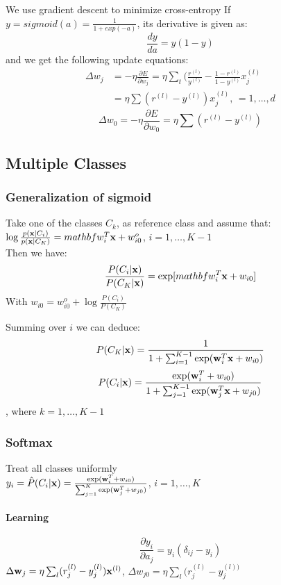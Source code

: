\begin{description}
        We use gradient descent to minimize cross-entropy 
        If $y = sigmoid(a) = \frac{1}{1 + exp(-a)}$, its derivative is given as:
        \[ \frac{dy}{da} = y(1-y) \]
        and we get the following update equations:
        \begin{align*}
            \Delta w_j & = -\eta \frac{\partial E}{\partial w_j} = \eta \sum_t
            ({\frac{r^{(l)}}{y^{(l)}}} - \frac{1-r^{(l)}}{1-y^{(l)}}x^{(l)}_j \\
            & = \eta \sum(r^{(l)} - y^{(l)}) x^{(l)}_j\mbox{, }= 1,\dots, d 
        \end{align*}
        \[
            \Delta w_0 = -\eta \frac{\partial E}{\partial w_0} = \eta\sum(r^{(l)} -
            y^{(l)}) 
        \]
\end{description}
\subsection{Multiple Classes}
\subsubsection{Generalization of sigmoid}
    Take one of the classes $C_k$, as reference class
        and assume that: \\
        $ \log\frac{p(\mathbf{x}|C_i)}{p(\mathbf{x}|C_K)} = mathbf{w}_i^T\mathbf{x}+ w_{i0}^o $,
        $i=1,\dots,K-1$\\
        Then we have:
        \[ \frac{P(C_i|\mathbf{x})}{P(C_K|\mathbf{x})} = \exp[mathbf{w}_i^T\mathbf{x}+w_{i0}] \]
        With $w_{i0} = w_{i0}^o + \log\frac{P(C_i)}{P(C_K)}$

     Summing over $i$ we can deduce: 
         \[P(C_K|\mathbf{x}) =
         \frac{1}{1+\sum_{i=1}^{K-1}\exp(\mathbf{w}_i^T\mathbf{x} + w_{i0})}\]
        \[P(C_i|\mathbf{x})
        =\frac{\exp(\mathbf{w}_i^T+w_{i0})}{1+\sum_{j=1}^{K-1}\exp(\mathbf{w}_j^T\mathbf{x}+w_{j0})}\],
    where $k=1,\dots, K-1$
\subsubsection{Softmax}
    Treat all classes uniformly\\ $y_i = \hat{P}(C_i|\mathbf{x}) =
        \frac{\exp(\mathbf{w}_i^T+w_{i0})}{\sum_{j=1}^K\exp(\mathbf{w}_j^T+w_{j0})}$,
        $i=1,\dots, K$
    \paragraph{Learning} 
        \[\frac{\partial y_i}{\partial a_j} = y_i (\delta_{ij}-y_i)\]
        $\Delta\mathbf{w}_j = \eta\sum_l(r_j^{(l)}-y_j^{(l)})\mathbf{x}^{(l)}$, $
        \Delta w_{j0} = \eta\sum_l(r_j^{(l)}-y_j^{(l))}$
